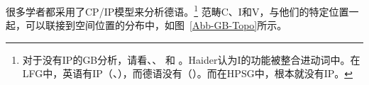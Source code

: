 很多学者都采用了CP/IP模型来分析德语。\footnote{
对于没有IP的GB分析，请看、、 和 。Haider认为I的功能被整合进动词中。在LFG中，英语有IP（\citealp[Section~6.2]{Bresnan2001a}、\citealp[Section~3.2.1]{Dalrymple2001a-u}），而德语没有（\citep[Section~3.2.3.2]{Berman2003a}）。而在HPSG中，根本就没有IP。
} 
范畴C、I和V，与他们的特定位置一起，可以联接到空间位置的分布中，如图~\vref{Abb-GB-Topo}所示。

